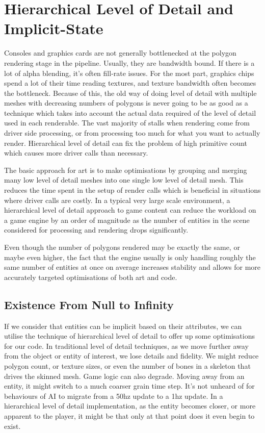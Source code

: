 \documentclass[a4paper,12pt]{article}
\begin{document}
\newpage
\section{Hierarchical Level of Detail and Implicit-State}

Consoles and graphics cards are not generally bottlenecked at the polygon rendering stage in the pipeline.
Usually, they are bandwidth bound.
If there is a lot of alpha blending, it's often fill-rate issues.
For the most part, graphics chips spend a lot of their time reading textures, and texture bandwidth often becomes the bottleneck.
Because of this, the old way of doing level of detail with multiple meshes with decreasing numbers of polygons is never going to be as good as a technique which takes into account the actual data required of the level of detail used in each renderable.
The vast majority of stalls when rendering come from driver side processing, or from processing too much for what you want to actually render.
Hierarchical level of detail can fix the problem of high primitive count which causes more driver calls than necessary.

The basic approach for art is to make optimisations by grouping and merging many low level of detail meshes into one single low level of detail mesh.
This reduces the time spent in the setup of render calls which is beneficial in situations where driver calls are costly.
In a typical very large scale environment, a hierarchical level of detail approach to game content can reduce the workload on a game engine by an order of magnitude as the number of entities in the scene considered for processing and rendering drops significantly.

Even though the number of polygons rendered may be exactly the same, or maybe even higher, the fact that the engine usually is only handling roughly the same number of entities at once on average increases stability and allows for more accurately targeted optimisations of both art and code.

\subsection{Existence From Null to Infinity}

If we consider that entities can be implicit based on their attributes, we can utilise the technique of hierarchical level of detail to offer up some optimisations for our code.
In traditional level of detail techniques, as we move further away from the object or entity of interest, we lose details and fidelity.
We might reduce polygon count, or texture sizes, or even the number of bones in a skeleton that drives the skinned mesh.
Game logic can also degrade.
Moving away from an entity, it might switch to a much coarser grain time step.
It's not unheard of for behaviours of AI to migrate from a 50hz update to a 1hz update.
In a hierarchical level of detail implementation, as the entity becomes closer, or more apparent to the player, it might be that only at that point does it even begin to exist.
\end{document}
